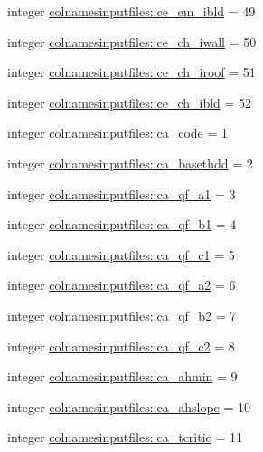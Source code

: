 \begin{DoxyCompactItemize}
integer \hyperlink{namespacecolnamesinputfiles_a36f00f5d675752bbd02cbd68d7841cb3}{colnamesinputfiles\+::ce\+\_\+em\+\_\+ibld} = 49
\item 
integer \hyperlink{namespacecolnamesinputfiles_a3c2f42c2b37b0bc609433059d9ce61f7}{colnamesinputfiles\+::ce\+\_\+ch\+\_\+iwall} = 50
\item 
integer \hyperlink{namespacecolnamesinputfiles_adc6090c20e009cceb9b732914e8112a3}{colnamesinputfiles\+::ce\+\_\+ch\+\_\+iroof} = 51
\item 
integer \hyperlink{namespacecolnamesinputfiles_aacf87521cff3cfe8225e058d87b8f3b1}{colnamesinputfiles\+::ce\+\_\+ch\+\_\+ibld} = 52
\item 
integer \hyperlink{namespacecolnamesinputfiles_a1a7e8bd4476814a4d4f952d2e1d7675f}{colnamesinputfiles\+::ca\+\_\+code} = 1
\item 
integer \hyperlink{namespacecolnamesinputfiles_ac69ac056fe76740c2ac86d2c55abdfe2}{colnamesinputfiles\+::ca\+\_\+basethdd} = 2
\item 
integer \hyperlink{namespacecolnamesinputfiles_a583d3666cb8c402df5ddac03a9cb3f3b}{colnamesinputfiles\+::ca\+\_\+qf\+\_\+a1} = 3
\item 
integer \hyperlink{namespacecolnamesinputfiles_a60c5a9e124e782290b151fe2c63403c5}{colnamesinputfiles\+::ca\+\_\+qf\+\_\+b1} = 4
\item 
integer \hyperlink{namespacecolnamesinputfiles_a0d5c9b53eab6ffe4cc1e25df034a9069}{colnamesinputfiles\+::ca\+\_\+qf\+\_\+c1} = 5
\item 
integer \hyperlink{namespacecolnamesinputfiles_af534cd6645265bff4b5f26561527d7ed}{colnamesinputfiles\+::ca\+\_\+qf\+\_\+a2} = 6
\item 
integer \hyperlink{namespacecolnamesinputfiles_afde76e64c191866b804e0a485fc87f2d}{colnamesinputfiles\+::ca\+\_\+qf\+\_\+b2} = 7
\item 
integer \hyperlink{namespacecolnamesinputfiles_a49e95edece4086849309f99d0ed5744a}{colnamesinputfiles\+::ca\+\_\+qf\+\_\+c2} = 8
\item 
integer \hyperlink{namespacecolnamesinputfiles_a73c71630c8ad18282f722f78f0a6ee4d}{colnamesinputfiles\+::ca\+\_\+ahmin} = 9
\item 
integer \hyperlink{namespacecolnamesinputfiles_a58e571a78d341b303b8c948394e48315}{colnamesinputfiles\+::ca\+\_\+ahslope} = 10
\item 
integer \hyperlink{namespacecolnamesinputfiles_a46c2c3ee0fbe4520e0cd9965d04b5cad}{colnamesinputfiles\+::ca\+\_\+tcritic} = 11
\item 

\end{DoxyCompactItemize}
